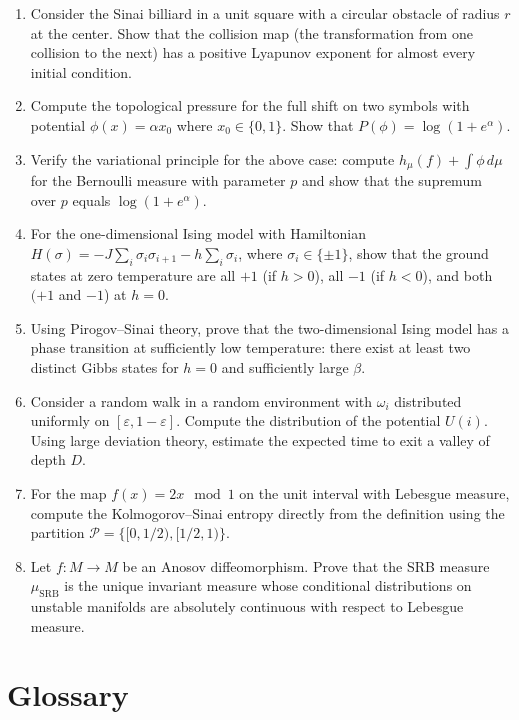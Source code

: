 \begin{enumerate}
  \item [I] Consider the Sinai billiard in a unit square with a circular obstacle of radius \(r\) at the center. Show that the collision map (the transformation from one collision to the next) has a positive Lyapunov exponent for almost every initial condition.
  \item [B] Compute the topological pressure for the full shift on two symbols with potential \(\phi(x) = \alpha x_0\) where \(x_0 \in \{0, 1\}\). Show that \(P(\phi) = \log(1 + e^\alpha)\).
  \item [B] Verify the variational principle for the above case: compute \(h_\mu(f) + \int \phi\, d\mu\) for the Bernoulli measure with parameter \(p\) and show that the supremum over \(p\) equals \(\log(1 + e^\alpha)\).
  \item [B] For the one-dimensional Ising model with Hamiltonian \(H(\sigma) = -J \sum_i \sigma_i \sigma_{i+1} - h \sum_i \sigma_i\), where \(\sigma_i \in \{\pm 1\}\), show that the ground states at zero temperature are all \(+1\) (if \(h > 0\)), all \(-1\) (if \(h < 0\)), and both \((+1\) and \(-1\)) at \(h = 0\).
  \item [A] Using Pirogov--Sinai theory, prove that the two-dimensional Ising model has a phase transition at sufficiently low temperature: there exist at least two distinct Gibbs states for \(h = 0\) and sufficiently large \(\beta\).
  \item [I] Consider a random walk in a random environment with \(\omega_i\) distributed uniformly on \([\varepsilon, 1-\varepsilon]\). Compute the distribution of the potential \(U(i)\). Using large deviation theory, estimate the expected time to exit a valley of depth \(D\).
  \item [B] For the map \(f(x) = 2x \mod 1\) on the unit interval with Lebesgue measure, compute the Kolmogorov--Sinai entropy directly from the definition using the partition \(\mathcal{P} = \{[0, 1/2), [1/2, 1)\}\).
  \item [A] Let \(f: M \to M\) be an Anosov diffeomorphism. Prove that the SRB measure \(\mu_{\text{SRB}}\) is the unique invariant measure whose conditional distributions on unstable manifolds are absolutely continuous with respect to Lebesgue measure.
\end{enumerate}

\section*{Glossary}

